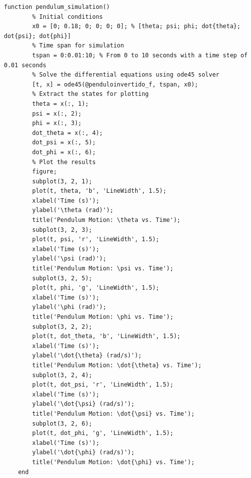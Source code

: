\documentclass[10pt]{article}
\begin{document}
\begin{appendices}
\begin{lstlisting}[caption={Código da simulação do sistema com ode45}, label=lst:pendulum_sim_r]
    function pendulum_simulation()
        % Initial conditions
        x0 = [0; 0.18; 0; 0; 0; 0]; % [theta; psi; phi; dot{theta}; dot{psi}; dot{phi}]
        % Time span for simulation
        tspan = 0:0.01:10; % From 0 to 10 seconds with a time step of 0.01 seconds
        % Solve the differential equations using ode45 solver
        [t, x] = ode45(@penduloinvertido_f, tspan, x0);
        % Extract the states for plotting
        theta = x(:, 1);
        psi = x(:, 2);
        phi = x(:, 3);
        dot_theta = x(:, 4);
        dot_psi = x(:, 5);
        dot_phi = x(:, 6);
        % Plot the results
        figure;
        subplot(3, 2, 1);
        plot(t, theta, 'b', 'LineWidth', 1.5);
        xlabel('Time (s)');
        ylabel('\theta (rad)');
        title('Pendulum Motion: \theta vs. Time');
        subplot(3, 2, 3);
        plot(t, psi, 'r', 'LineWidth', 1.5);
        xlabel('Time (s)');
        ylabel('\psi (rad)');
        title('Pendulum Motion: \psi vs. Time');
        subplot(3, 2, 5);
        plot(t, phi, 'g', 'LineWidth', 1.5);
        xlabel('Time (s)');
        ylabel('\phi (rad)');
        title('Pendulum Motion: \phi vs. Time');
        subplot(3, 2, 2);
        plot(t, dot_theta, 'b', 'LineWidth', 1.5);
        xlabel('Time (s)');
        ylabel('\dot{\theta} (rad/s)');
        title('Pendulum Motion: \dot{\theta} vs. Time');
        subplot(3, 2, 4);
        plot(t, dot_psi, 'r', 'LineWidth', 1.5);
        xlabel('Time (s)');
        ylabel('\dot{\psi} (rad/s)');
        title('Pendulum Motion: \dot{\psi} vs. Time');
        subplot(3, 2, 6);
        plot(t, dot_phi, 'g', 'LineWidth', 1.5);
        xlabel('Time (s)');
        ylabel('\dot{\phi} (rad/s)');
        title('Pendulum Motion: \dot{\phi} vs. Time');
    end


\end{lstlisting}
\end{appendices}
\end{document}
